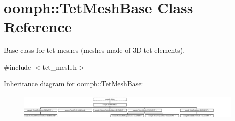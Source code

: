 \hypertarget{classoomph_1_1TetMeshBase}{}\section{oomph\+:\+:Tet\+Mesh\+Base Class Reference}
\label{classoomph_1_1TetMeshBase}


Base class for tet meshes (meshes made of 3D tet elements).  




{\ttfamily \#include $<$tet\+\_\+mesh.\+h$>$}

Inheritance diagram for oomph\+:\+:Tet\+Mesh\+Base\+:\begin{figure}[H]
\begin{center}
\leavevmode
\includegraphics[height=1.314554cm]{classoomph_1_1TetMeshBase}
\end{center}
\end{figure}
